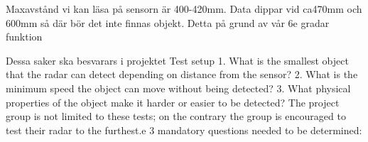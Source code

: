 Maxavstånd vi kan läsa på sensorn är 400-420mm. 
Data dippar vid ca470mm och 600mm så där bör det inte finnas objekt. Detta på grund av vår 6e gradar funktion 


Dessa saker ska besvarars i projektet
Test setup
1.
What is the smallest object that the radar can detect depending on distance from the
sensor?
2.
What is the minimum speed the object can move without being detected?
3.
What physical properties of the object make it harder or easier to be detected?
The project group is not limited to these tests; on the contrary the group is encouraged to
test their radar to the furthest.e 3 mandatory questions needed to be determined: